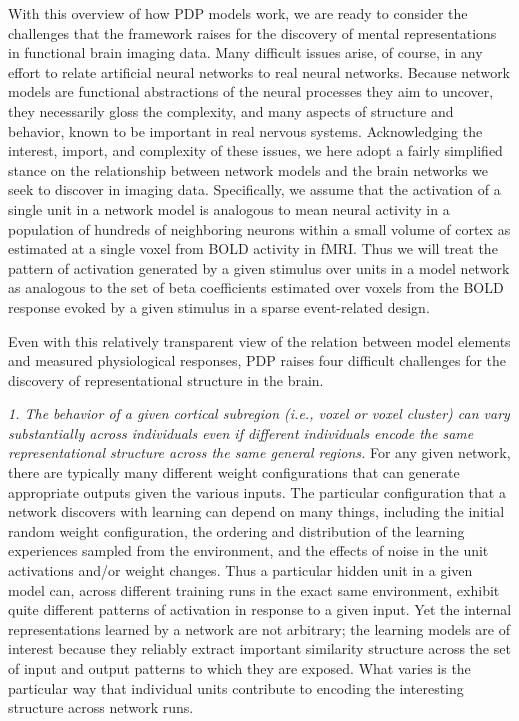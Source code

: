With this overview of how PDP models work, we are ready to consider the challenges that the framework raises for the discovery of mental representations in functional brain imaging data. Many difficult issues arise, of course, in any effort to relate artificial neural networks to real neural networks. Because network models are functional abstractions of the neural processes they aim to uncover, they necessarily gloss the complexity, and many aspects of structure and behavior, known to be important in real nervous systems. Acknowledging the interest, import, and complexity of these issues, we here adopt a fairly simplified stance on the relationship between network models and the brain networks we seek to discover in imaging data. Specifically, we assume that the activation of a single unit in a network model is analogous to mean neural activity in a population of hundreds of neighboring neurons within a small volume of cortex as estimated at a single voxel from BOLD activity in fMRI. Thus we will treat the pattern of activation generated by a given stimulus over units in a model network as analogous to the set of beta coefficients estimated over voxels from the BOLD response evoked by a given stimulus in a sparse event-related design. 

Even with this relatively transparent view of the relation between model elements and measured physiological responses, PDP raises four difficult challenges for the discovery of representational structure in the brain.

{\em 1. The behavior of a given cortical subregion (i.e., voxel or voxel cluster) can vary substantially across individuals even if different individuals encode the same representational structure across the same general regions.} For any given network, there are typically many different weight configurations that can generate appropriate outputs given the various inputs. The particular configuration that a network discovers with learning can depend on many things, including the initial random weight configuration, the ordering and distribution of the learning experiences sampled from the environment, and the effects of noise in the unit activations and/or weight changes. Thus a particular hidden unit in a given model can, across different training runs in the exact same environment, exhibit quite different patterns of activation in response to a given input. Yet the internal representations learned by a network are not arbitrary; the learning models are of interest because they reliably extract important similarity structure across the set of input and output patterns to which they are exposed. What varies is the particular way that individual units contribute to encoding the interesting structure across network runs. 

